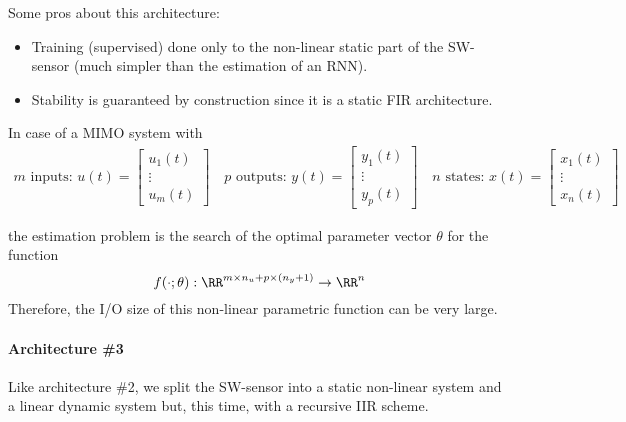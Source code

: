 \begin{rem}[Pros]
	Some pros about this architecture:
	\begin{itemize}
		\item Training (supervised) done only to the non-linear static part of the SW-sensor (much simpler than the estimation of an RNN).
		\item Stability is guaranteed by construction since it is a static FIR architecture.
	\end{itemize}	
\end{rem}

\begin{rem}[Cons]
    In case of a MIMO system with
    \begin{align*}
        m \text{ inputs: } u(t) = \begin{bmatrix}
            u_1(t) \\
            \vdots \\
            u_m(t)
        \end{bmatrix} \quad p \text{ outputs: } y(t) = \begin{bmatrix}
            y_1(t) \\
            \vdots \\
            y_p(t)
        \end{bmatrix} \quad n \text{ states: } x(t) = \begin{bmatrix}
            x_1(t) \\
            \vdots \\
            x_n(t)
        \end{bmatrix}
    \end{align*}

    the estimation problem is the search of the optimal parameter vector $\theta$ for the function
    \[
        f(\cdot; \theta): \RR^{m\times n_u + p \times (n_y + 1)} \rightarrow \RR^n
    \]    
    Therefore, the I/O size of this non-linear parametric function can be very large.
\end{rem}

\paragraph{Architecture \#3} Like architecture \#2, we split the SW-sensor into a static non-linear system and a linear dynamic system but, this time, with a recursive IIR scheme.

